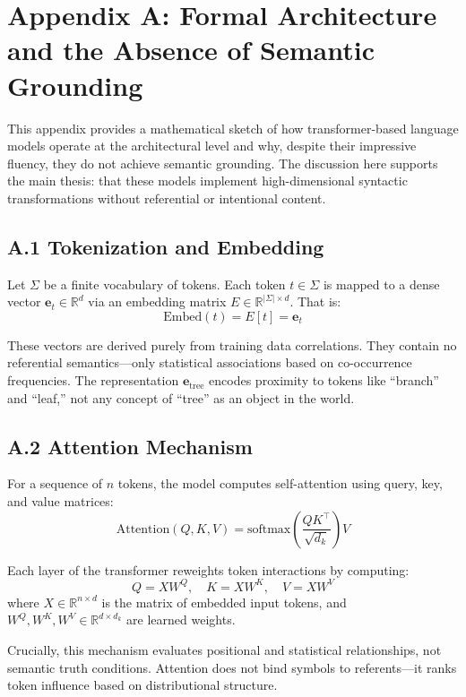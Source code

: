 \newpage

\appendix
\section*{Appendix A: Formal Architecture and the Absence of Semantic Grounding}

This appendix provides a mathematical sketch of how transformer-based language models operate at the architectural level and why, despite their impressive fluency, they do not achieve semantic grounding. The discussion here supports the main thesis: that these models implement high-dimensional syntactic transformations without referential or intentional content.

\subsection*{A.1 Tokenization and Embedding}

Let \( \Sigma \) be a finite vocabulary of tokens. Each token \( t \in \Sigma \) is mapped to a dense vector \( \mathbf{e}_t \in \mathbb{R}^d \) via an embedding matrix \( E \in \mathbb{R}^{|\Sigma| \times d} \). That is:
\[
\text{Embed}(t) = E[t] = \mathbf{e}_t
\]

These vectors are derived purely from training data correlations. They contain no referential semantics—only statistical associations based on co-occurrence frequencies. The representation \( \mathbf{e}_{\text{tree}} \) encodes proximity to tokens like “branch” and “leaf,” not any concept of “tree” as an object in the world.

\subsection*{A.2 Attention Mechanism}

For a sequence of \( n \) tokens, the model computes self-attention using query, key, and value matrices:
\[
\text{Attention}(Q, K, V) = \text{softmax} \left( \frac{QK^\top}{\sqrt{d_k}} \right) V
\]

Each layer of the transformer reweights token interactions by computing:
\[
Q = XW^Q, \quad K = XW^K, \quad V = XW^V
\]
where \( X \in \mathbb{R}^{n \times d} \) is the matrix of embedded input tokens, and \( W^Q, W^K, W^V \in \mathbb{R}^{d \times d_k} \) are learned weights.

Crucially, this mechanism evaluates positional and statistical relationships, not semantic truth conditions. Attention does not bind symbols to referents—it ranks token influence based on distributional structure.

